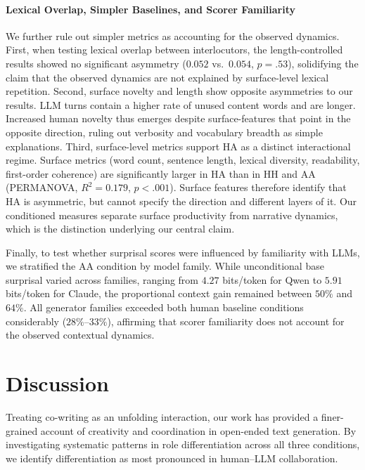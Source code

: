 \documentclass[11pt]{article}
\begin{document}
\paragraph{Lexical Overlap, Simpler Baselines, and Scorer Familiarity}
We further rule out simpler metrics as accounting for the observed dynamics. First, when testing lexical overlap between interlocutors, the length-controlled results showed no significant asymmetry ($0.052$ vs.\ $0.054$, $p=.53$), solidifying the claim that the observed dynamics are not explained by surface-level lexical repetition. Second, surface novelty and length show opposite asymmetries to our results. LLM turns contain a higher rate of unused content words and are longer. Increased human novelty thus emerges despite surface-features that point in the opposite direction, ruling out verbosity and vocabulary breadth as simple explanations. Third, surface-level metrics support HA as a distinct interactional regime. Surface metrics (word count, sentence length, lexical diversity, readability, first-order coherence) are significantly larger in HA than in HH and AA (PERMANOVA, $R^{2}=0.179$, $p<.001$). Surface features therefore identify that HA is asymmetric, but cannot specify the direction and different layers of it. Our conditioned measures separate surface productivity from narrative dynamics, which is the distinction underlying our central claim.

Finally, to test whether surprisal scores were influenced by familiarity with LLMs, we stratified the AA condition by model family. While unconditional base surprisal varied across families, ranging from $4.27$ bits/token for Qwen to $5.91$ bits/token for Claude, the proportional context gain remained between $50\%$ and $64\%$. All generator families exceeded both human baseline conditions considerably ($28\%$--$33\%$), affirming that scorer familiarity does not account for the observed contextual dynamics. 



\section{Discussion}
Treating co-writing as an unfolding interaction, our work has provided a finer-grained account of creativity and coordination in open-ended text generation. By investigating systematic patterns in role differentiation across all three conditions, we identify differentiation as most pronounced in human--LLM collaboration.
\end{document}
